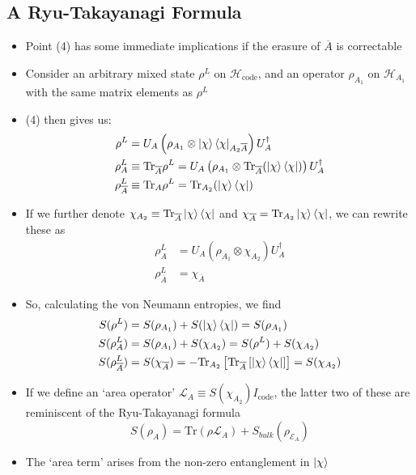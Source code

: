 \documentclass[12pt,a4paper]{article}
\numberwithin{equation}{section}
\newcommand{\ketbra}[2]{\ket{#1}\bra{#2}}
\newcommand{\ketbras}[1]{\ketbra{#1}{#1}}
\newcommand{\Hcode}{\mathcal{H}_{\text{code}}}
\theoremstyle{definition}
\theoremstyle{theorem}
\theoremstyle{example}
\begin{document}
	\subsection{A Ryu-Takayanagi Formula}
	\begin{itemize}
		\item Point (4) has some immediate implications if the erasure of $\overline{A}$ is correctable
		\item Consider an arbitrary mixed state $\rho^{L}$ on $\Hcode$, and an operator $\rho_{A_{1}}$ on $\mathcal{H}_{A_{1}}$ with the same matrix elements as $\rho^{L}$
		\item (4) then gives us:
		\begin{equation}
			\begin{aligned}
				\rho^{L}&=U_{A}\left(\rho_{A_{1}}\otimes\ketbras{\chi}_{A_{2}\overline{A}}\right)U_{A}^{\dagger}\\
				\rho^{L}_{A}&\equiv\text{Tr}_{\overline{A}}\rho^{L}=U_{A}\left(\rho_{A_{1}}\otimes\text{Tr}_{\overline{A}}(\ketbras{\chi})\right)U_{A}^{\dagger}\\
				\rho^{L}_{\overline{A}}&\equiv \text{Tr}_{A}\rho^{L}=\text{Tr}_{A_{2}}(\ketbras{\chi})
			\end{aligned}
		\end{equation}
		\item If we further denote $\chi_{A_{2}}\equiv\text{Tr}_{\overline{A}}\ketbras{\chi}$ and $\chi_{\overline{A}}=\text{Tr}_{A_{2}}\ketbras{\chi}$, we can rewrite these as
		\begin{equation}
			\begin{aligned}
				\rho_{A}^{L}&=U_{A}\left(\rho_{A_{1}}\otimes\chi_{A_{2}}\right)U_{A}^{\dagger}\\
				\rho_{\overline{A}}^{L}&=\chi_{\overline{A}}
			\end{aligned}
		\end{equation}
		\item So, calculating the von Neumann entropies, we find
		\begin{equation}
			\begin{aligned}
				S(\rho^{L})&=S(\rho_{A_{1}})+S(\ketbras{\chi})=S(\rho_{A_{1}})\\
				S(\rho^{L}_{A})&=S(\rho_{A_{1}})+S(\chi_{A_{2}})=S(\rho^{L})+S(\chi_{A_{2}})\\
				S(\rho_{\overline{A}}^{L})&=S(\chi_{\overline{A}})=-\text{Tr}_{A_{2}}\left[\text{Tr}_{\overline{A}}\left[\ketbras{\chi}\right]\right]=S(\chi_{A_{2}})
			\end{aligned}
		\end{equation}
		\item If we define an `area operator' $\mathcal{L}_{A}\equiv S(\chi_{A_{2}})I_{\text{code}}$, the latter two of these are reminiscent of the Ryu-Takayanagi formula
		\begin{equation}
			S(\rho_{A})=\text{Tr}(\rho\mathcal{L}_{A})+S_{bulk}(\rho_{\mathcal{E}_{A}})
		\end{equation}
		\item The `area term' arises from the non-zero entanglement in $\ket{\chi}$
	\end{itemize}
\end{document}
